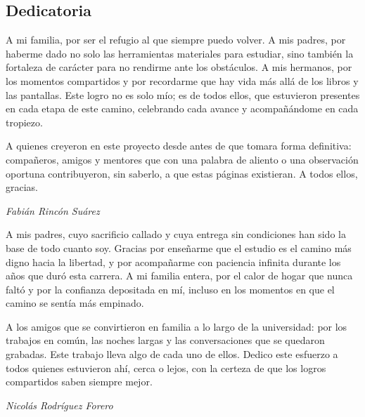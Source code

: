 \subsection*{Dedicatoria}
\vspace*{0.8cm}
{\hfill
    \begin{minipage}{0.7\textwidth}
        \noindent
        A mi familia, por ser el refugio al que siempre puedo volver. A mis padres, por haberme dado no solo las herramientas materiales para estudiar, sino tambi\'en la fortaleza de car\'acter para no rendirme ante los obst\'aculos. A mis hermanos, por los momentos compartidos y por recordarme que hay vida m\'as all\'a de los libros y las pantallas. Este logro no es solo m\'io; es de todos ellos, que estuvieron presentes en cada etapa de este camino, celebrando cada avance y acompa\~n\'andome en cada tropiezo.\\
        \vspace*{0.2cm}

        \noindent
        A quienes creyeron en este proyecto desde antes de que tomara forma definitiva: compa\~neros, amigos y mentores que con una palabra de aliento o una observaci\'on oportuna contribuyeron, sin saberlo, a que estas p\'aginas existieran. A todos ellos, gracias.\\
        \vspace*{0.3cm}

        \hfill\textit{Fabi\'an Rinc\'on Su\'arez}\\
    \end{minipage}
}
\vfill

{\hfill
    \begin{minipage}{0.7\textwidth}
        \noindent
        A mis padres, cuyo sacrificio callado y cuya entrega sin condiciones han sido la base de todo cuanto soy. Gracias por ense\~narme que el estudio es el camino m\'as digno hacia la libertad, y por acompa\~narme con paciencia infinita durante los a\~nos que dur\'o esta carrera. A mi familia entera, por el calor de hogar que nunca falt\'o y por la confianza depositada en m\'i, incluso en los momentos en que el camino se sent\'ia m\'as empinado.\\
        \vspace*{0.2cm}

        \noindent
        A los amigos que se convirtieron en familia a lo largo de la universidad: por los trabajos en com\'un, las noches largas y las conversaciones que se quedaron grabadas. Este trabajo lleva algo de cada uno de ellos. Dedico este esfuerzo a todos quienes estuvieron ah\'i, cerca o lejos, con la certeza de que los logros compartidos saben siempre mejor.\\
        \vspace*{0.3cm}

        \hfill\textit{Nicol\'as Rodr\'iguez Forero}\\
    \end{minipage}
}
\vfill

